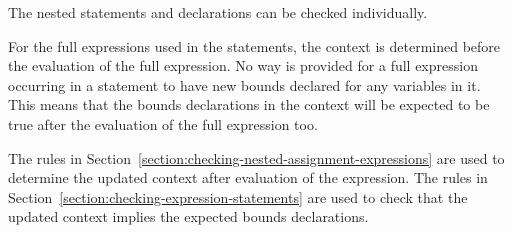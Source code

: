 The nested statements and declarations can be checked individually.

For the full expressions used in the statements, the context is determined
before the evaluation of the full expression. No way is provided for a
full expression occurring in a statement to have new bounds declared 
for any variables in it. This means that the bounds declarations in the
context will be expected to be true after the evaluation of the full expression too.

The rules in Section~\ref{section:checking-nested-assignment-expressions}
are used to determine the updated context after evaluation of the
expression. The rules in Section~\ref{section:checking-expression-statements}
are used to check that the updated
context implies the expected bounds declarations.

